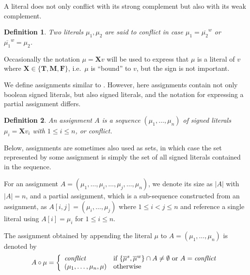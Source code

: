 \documentclass{vutinfth} %
\newtheorem{definition}{Definition}[chapter]
\newtheorem*{remark}{Remark}
\newcommand{\negstrong}[1]{\overline{#1}^s}
\newcommand{\negweak}[1]{\overline{#1}^w}
\newcommand{\ass}{A}
\newcommand{\bT}{\mathbf{T}}
\newcommand{\bM}{\mathbf{M}}
\newcommand{\bF}{\mathbf{F}}
\newcommand{\bX}{\mathbf{X}}
\newcommand{\sgl}{\mu}
\newcommand{\thrice}{{\{\bT, \bM, \bF \}}}
\begin{document}
A literal does not only conflict with its strong complement but also with its weak complement.

\begin{definition}
Two literals $\sgl_1, \sgl_2$ are said to \emph{conflict} in case $\sgl_1 = \negweak{\sgl_2}$ or $\negweak{\sgl_1} = \sgl_2$.
\end{definition}

Occasionally the notation $\sgl = \bX v$ will be used to express that $\sgl$ is a literal of $v$ where $\bX \in \thrice$, i.e.~$\sgl$ is \enquote{bound} to $v$, but the sign is not important.

We define assignments similar to \cite[Section 2, p.~3]{clasp}. However, here assignments contain not only boolean signed literals, but also signed literals, and the notation for expressing a partial assignment differs.

\begin{definition}
An \emph{assignment} $\ass$ is a sequence $(\sgl_1, \ldots, \sgl_n)$ of signed literals $\sgl_i = \bX v_i$ with $1 \leq i \leq n$, or \emph{conflict}.
\end{definition}

Below, assignments are sometimes also used as sets, in which case the set represented by some assignment is simply the set of all signed literals contained in the sequence.

For an assignment $\ass = (\sgl_1, \ldots, \sgl_i, \ldots, \sgl_j, \ldots, \sgl_n)$, we denote its size as $|\ass|$ with $|\ass| = n$, and a partial assignment, which is a sub-sequence constructed from an assignment, as $\ass[i,j] = (\sgl_i, \ldots, \sgl_j)$ where $1 \leq i < j \leq n$ and reference a single literal using $A[i] = \sgl_i$ for $1 \leq i \leq n$.

The assignment obtained by appending the literal $\sgl$ to $\ass = (\sgl_1, \ldots, \sgl_n)$ is denoted by $$\ass \circ \sgl = \left\{\begin{array}{ll}
        
        \emph{conflict} & \text{if } \{ \negstrong{\sgl}, \negweak{\sgl} \} \cap \ass \not = \emptyset \text{ or } \ass = \emph{conflict}\\
        (\sgl_1, \ldots, \sgl_{n}, \sgl) & \text{otherwise} \\
        \end{array}\right.$$
\end{document}
